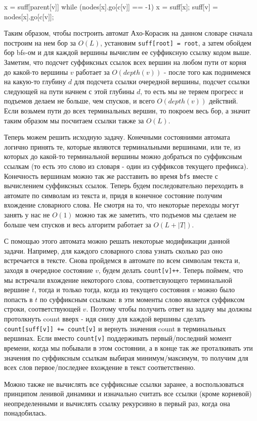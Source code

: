 \begin{cppcode}
x = suff[parent[v]]
while (nodes[x].go[c[v]] == -1)
	x = suff[x];
suff[v] = nodes[x].go[c[v]];
\end{cppcode}
 
Таким образом, чтобы построить автомат Ахо-Корасик на данном словаре сначала построим на нем бор за $O(L)$, установим \texttt{suff[root] = root}, а затем обойдем бор bfs-ом и для каждой вершины вычислим ее суффиксную ссылку кодом выше. Заметим, что подсчет суффиксных ссылок всех вершин на любом пути от корня до какой-то вершины $v$ работает за $O(depth(v))$ - после того как поднимемся на какую-то глубину $d$ для подсчета ссылки очередной вершины, подсчет ссылки следующей на пути начнем с этой глубины $d$, то есть мы не теряем прогресс и подъемов делаем не больше, чем спусков, и всего $O(depth(v))$ действий. Если возьмем пути до всех терминальных вершин, то покроем весь бор, а значит таким образом мы посчитаем ссылки также за $O(L)$. 

Теперь можем решить исходную задачу. Конечными состояниями автомата логично принять те, которые являются терминальными вершинами, или те, из которых до какой-то терминальной вершины можно добраться по суффиксным ссылкам (то есть это слово из словаря - один из суффиксов текущего префикса). Конечность вершинам можно так же расставить во время \texttt{bfs} вместе с вычислением суффиксных ссылок. Теперь будем последовательно переходить в автомате по символам из текста и, придя в конечное состояние получим вхождение словарного слова. Не смотря на то, что некоторые переходы могут занять у нас не $O(1)$ можно так же заметить, что подъемов мы сделаем не больше чем спусков и весь алгоритм работает за $O(L + |T|)$.

С помощью этого автомата можно решать некоторые модификации данной задачи. Например, для каждого словарного слова узнать сколько раз оно встречается в тексте. Снова пройдемся в автомате по  всем символам текста и, заходя в очередное состояние $v$, будем делать \texttt{count[v]++}. Теперь поймем, что мы встречали вхождение некоторого слова, соответсвующего терминальной вершине $t$, тогда и только тогда, когда из текущего состояния $v$ можно было попасть в $t$ по суффиксным ссылкам: в эти моменты слово является суффиксом строки, соответствующей $v$. Поэтому чтобы получить ответ на задачу мы должны протолкнуть count вверх - идя снизу для каждой вершины сделать \texttt{count[suff[v]] += count[v]} и вернуть значения count в терминальных вершинах. Если вместо \texttt{count[v]} поддерживать первый/последний момент времени, когда мы побывали в этом состоянии, а в конце так же проталкивать эти значения по суффиксным ссылкам выбирая минимум/максимум, то получим для всех слов первое/последнее вхождение в текст соответственно.

Можно также не вычислять все суффиксные ссылки заранее, а воспользоваться принципом ленивой динамики и изначально считать все ссылки (кроме корневой) неопределенными и вычислять ссылку рекурсивно в первый раз, когда она понадобилась.
